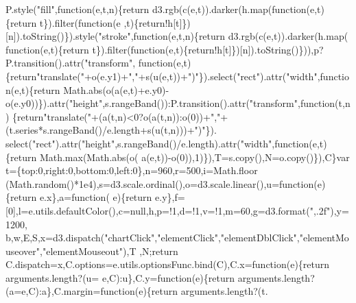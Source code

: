 \begin{DoxyCode}
      P.style(\textcolor{stringliteral}{"fill"},\textcolor{keyword}{function}(e,t,n)\{return d3.rgb(c(e,t)).darker(h.map(function(e,t)\{return t\}).filter(\textcolor{keyword}{function}(e
      ,t)\{\textcolor{keywordflow}{return}!h[t]\})[n]).toString()\}).style(\textcolor{stringliteral}{"stroke"},\textcolor{keyword}{function}(e,t,n)\{\textcolor{keywordflow}{return} d3.rgb(c(e,t)).darker(h.map(\textcolor{keyword}{
      function}(e,t)\{return t\}).filter(\textcolor{keyword}{function}(e,t)\{\textcolor{keywordflow}{return}!h[t]\})[n]).toString()\})),p?P.transition().attr(\textcolor{stringliteral}{"transform"},\textcolor{keyword}{
      function}(e,t)\{\textcolor{keywordflow}{return}\textcolor{stringliteral}{"translate("}+o(e.y1)+\textcolor{stringliteral}{","}+s(u(e,t))+\textcolor{stringliteral}{")"}\}).select(\textcolor{stringliteral}{"rect"}).attr(\textcolor{stringliteral}{"width"},\textcolor{keyword}{function}(e,t)\{\textcolor{keywordflow}{return} 
      Math.abs(o(a(e,t)+e.y0)-o(e.y0))\}).attr(\textcolor{stringliteral}{"height"},s.rangeBand()):P.transition().attr(\textcolor{stringliteral}{"transform"},\textcolor{keyword}{function}(t,n)
      \{\textcolor{keywordflow}{return}\textcolor{stringliteral}{"translate("}+(a(t,n)<0?o(a(t,n)):o(0))+\textcolor{stringliteral}{","}+(t.series*s.rangeBand()/e.length+s(u(t,n)))+\textcolor{stringliteral}{")"}\}).
      select(\textcolor{stringliteral}{"rect"}).attr(\textcolor{stringliteral}{"height"},s.rangeBand()/e.length).attr(\textcolor{stringliteral}{"width"},function(e,t)\{\textcolor{keywordflow}{return} Math.max(Math.abs(o(
      a(e,t))-o(0)),1)\}),T=s.copy(),N=o.copy()\}),C\}var t=\{top:0,right:0,bottom:0,left:0\},n=960,r=500,i=Math.floor
      (Math.random()*1e4),s=d3.scale.ordinal(),o=d3.scale.linear(),u=\textcolor{keyword}{function}(e)\{\textcolor{keywordflow}{return} e.x\},a=\textcolor{keyword}{function}(
      e)\{\textcolor{keywordflow}{return} e.y\},f=[0],l=e.utils.defaultColor(),c=null,h,p=!1,d=!1,v=!1,m=60,g=d3.format(\textcolor{stringliteral}{",.2f"}),y=1200,
      b,w,E,S,x=d3.dispatch(\textcolor{stringliteral}{"chartClick"},\textcolor{stringliteral}{"elementClick"},\textcolor{stringliteral}{"elementDblClick"},\textcolor{stringliteral}{"elementMouseover"},\textcolor{stringliteral}{"elementMouseout"}),T
      ,N;\textcolor{keywordflow}{return} C.dispatch=x,C.options=e.utils.optionsFunc.bind(C),C.x=\textcolor{keyword}{function}(e)\{\textcolor{keywordflow}{return} arguments.length?(u=
      e,C):u\},C.y=\textcolor{keyword}{function}(e)\{\textcolor{keywordflow}{return} arguments.length?(a=e,C):a\},C.margin=\textcolor{keyword}{function}(e)\{\textcolor{keywordflow}{return} arguments.length?(t.

\end{DoxyCode}
